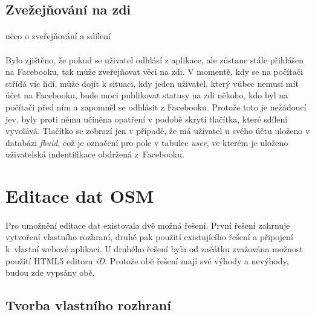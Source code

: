 \documentclass[11pt,a4paper,titlepage,oneside]{book}
\begin{document}
			\subsection{Zvežejňování na zdi}



				\paragraph{} {\Huge něco o zveřejňování a sdílení}
				\paragraph{} Bylo zjištěno, že pokud se uživatel odhlásí z aplikace, ale zůstane stále přihlášen na Facebooku, tak může zveřejňovat věci na zdi. V momentě, kdy se na počítači střídá víc lidí, může dojít k situaci, kdy jeden uživatel, který vůbec nemusí mít účet na Facebooku, bude moci publikovat statusy na zdi někoho, kdo byl na počítači před ním a zapomněl se odhlásit z Facebooku. Protože toto je nežádoucí jev, byly proti němu učiněna opatření v podobě skrytí tlačítka, které sdílení vyvolává. Tlačítko se zobrazí jen v případě, že má uživatel u svého účtu uloženo v databázi \textit{fbuid}, což je označení pro pole v tabulce \textit{user}, ve kterém je uloženo uživatelská indentifikace obdržená z~Facebooku.
		

		\section{Editace dat OSM}


				\paragraph{} Pro umožnění editace dat existovala dvě možná řešení. První řešení zahrnuje vytvoření vlastního rozhraní, druhé pak použití existujícího řešení a připojení k~vlastní webové aplikaci. U druhého řešení byla od začátku zvažována možnost použití HTML5 editoru \textit{iD}. Protože obě řešení mají své výhody a nevýhody, budou zde vypsány obě.
			\subsection{Tvorba vlastního rozhraní}
\end{document}
